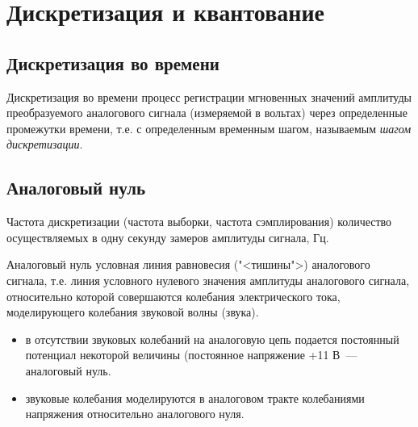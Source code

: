 \documentclass{beamer}
\begin{document}
\section{Дискретизация и квантование}
\subsection{Дискретизация во времени}
\begin{frame}
\begin{block}{Дискретизация во времени}
процесс регистрации мгновенных значений амплитуды преобразуемого аналогового сигнала (измеряемой в вольтах) через определенные промежутки времени, т.е. с определенным временным шагом, называемым \textit{шагом дискретизации}. 
\end{block}
\end{frame}

\subsection{Аналоговый нуль}
\begin{frame}
\begin{block}{Частота дискретизации (частота выборки, частота сэмплирования) }
количество осуществляемых в одну секунду замеров амплитуды сигнала, Гц. 
\end{block}

\begin{block}{Аналоговый нуль}
условная линия равновесия ("<тишины">) аналогового сигнала, т.е. линия условного нулевого значения амплитуды
аналогового сигнала, относительно которой совершаются колебания электрического тока, моделирующего колебания звуковой волны (звука).
\end{block}
\begin{itemize}
\item в отсутствии звуковых колебаний на аналоговую цепь подается постоянный потенциал некоторой величины (постоянное напряжение +11 В~--- аналоговый нуль. 
\item звуковые колебания моделируются в аналоговом тракте колебаниями напряжения относительно аналогового нуля.
\end{itemize}
\end{frame}
\end{document}
